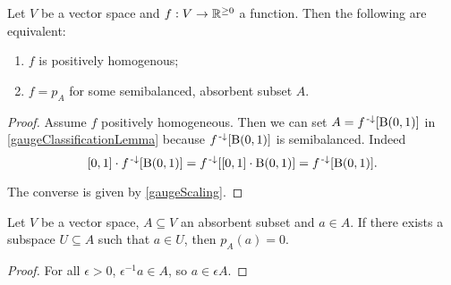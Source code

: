 \begin{proposition} \label{gaugeClassification}
Let $V$ be a vector space and $f: V\to \mathbb{R}^{\geq 0}$ a function.
Then the following are equivalent:
\begin{enumerate}
\item $f$ is positively homogenous;
\item $f = p_A$ for some semibalanced, absorbent subset $A$.
\end{enumerate}
\end{proposition}
\begin{proof}
Assume $f$ positively homogeneous. Then we can set $A = f^{{\text{\hspace{0.15em}-}\downarrow}}[\operatorname{B}(0,1)]$ in \ref{gaugeClassificationLemma} because $f^{{\text{\hspace{0.15em}-}\downarrow}}[\operatorname{B}(0,1)]$ is semibalanced. Indeed
\[ \interval{0,1}\cdot f^{\preimf}[\ball(0,1)] = f^{\preimf}[\interval{0,1}\cdot\ball(0,1)] = f^{\preimf}[\ball(0,1)]. \]

The converse is given by \ref{gaugeScaling}.
\end{proof}

\begin{lemma} \label{gaugeZeroLemma}
Let $V$ be a vector space, $A\subseteq V$ an absorbent subset and $a\in A$. If there exists a subspace $U\subseteq A$ such that $a\in U$, then $p_A(a) = 0$.
\end{lemma}
\begin{proof}
For all $\epsilon > 0$, $\epsilon^{-1}a\in A$, so $a\in \epsilon A$.
\end{proof}

